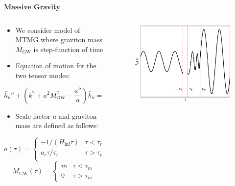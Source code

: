 \documentclass{beamer}                             %
\newcommand{\blocktitle}[1]{{\Large \textbf{#1}}}
\begin{document}
\begin{frame}[t]
\begin{columns}[T]
\begin{column}{0.30\textwidth}
  \begin{tcolorbox}
    \blocktitle{Massive Gravity}
    \vspace{0.25\baselineskip}
    \begin{columns}
      \hfill
      \begin{column}{0.5\textwidth}
      \begin{itemize}
          \item  We consider model of MTMG \cite{DeFelice:2015hla} where graviton mass $M_{\text{GW}}$ is step-function of time \cite{Fujita:2018ehq}
          \item Equation of motion for the two tensor modes:
      \end{itemize} 
      $$\bar{h}_k'' + \left(k^2 + a^2 M_\text{GW}^2 - \frac{a''}{a}\right)\bar{h}_k = 0 $$  
    \begin{itemize}
        \item Scale factor $a$ and graviton mass are defined as follows:
    \end{itemize}
        $$a(\tau) = 
    \begin{cases}
        -1/(H_{\inf}\tau) & \tau < \tau_r \\
        a_r \tau/\tau_r & \tau > \tau_r \\
   \end{cases} $$
    $$M_\text{GW}(\tau) = 
    \begin{cases}
        m & \tau < \tau_m \\
        0 & \tau > \tau_m
   \end{cases}$$
      \end{column}
      \begin{column}{0.48\textwidth}
        \begin{figure}[t]
          \centering
          \includegraphics[width=\linewidth]{fig1.pdf} 
          \label{fig:mode}
        \end{figure}
      \end{column}
    \end{columns}
  \end{tcolorbox}
\end{column}


\end{columns}
\end{frame}
\end{document}
